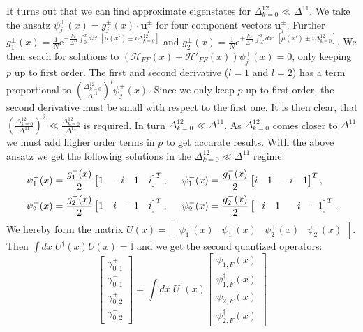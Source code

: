It turns out that we can find approximate eigenstates for $\Delta^{12}_{k=0} \ll \Delta^{11}$. We take the ansatz $\psi_j^{\pm}(x) = g_j^{\pm}(x)\cdot \mathbf{u}^{\pm}_j$ for four component vectors $\mathbf{u}^{\pm}_j$. Further $g_1^{\pm}(x) = \frac{1}{N}\text{e}^{-\frac{k_F}{\Delta^{11}}\int_0^x dx' \; \left[\mu(x') \pm i\Delta^{12}_{k=0}\right] }$ and $g_2^{\pm}(x) = \frac{1}{N}\text{e}^{+\frac{k_F}{\Delta^{11}}\int_{\mathcal{L}}^x dx' \; \left[\mu(x') \pm i\Delta^{12}_{k=0}\right] }$. We then seach for solutions to $(\mathcal{H}_{FF}(x) + \mathcal{H}'_{FF}(x))\psi_j^{\pm}(x) = 0$, only keeping $p$ up to first order. The first and second derivative ($l = 1$ and $l = 2$) has a term proportional to $\left(\frac{\Delta^{12}_{k=0}}{\Delta^{11}}\right)^l\psi_j^{\pm}(x)$. Since we only keep $p$ up to first order, the second derivative must be small with respect to the first one. It is then clear, that $\left(\frac{\Delta^{12}_{k=0}}{\Delta^{11}}\right)^2 \ll \frac{\Delta^{12}_{k=0}}{\Delta^{11}}$ is required. In turn $\Delta^{12}_{k=0} \ll \Delta^{11}$. As $\Delta^{12}_{k=0}$ comes closer to $\Delta^{11}$ we must add higher order terms in $p$ to get accurate results. With the above ansatz we get the following solutions in the $\Delta^{12}_{k=0} \ll \Delta^{11}$ regime:
\begin{align}
\psi_1^{+}(x) &= \frac{g_1^{+}(x)}{2}\begin{bmatrix} 1 & -i & 1 & i \end{bmatrix}^T, \hspace{0.5cm} \psi_1^{-}(x) = \frac{g_1^{-}(x)}{2}\begin{bmatrix} i & 1 & -i & 1 \end{bmatrix}^T, \nonumber \\
\psi_2^{+}(x) &= \frac{g_2^{+}(x)}{2}\begin{bmatrix} 1 & i & -1 & i \end{bmatrix}^T, \hspace{0.5cm} \psi_2^{-}(x) = \frac{g_2^{-}(x)}{2}\begin{bmatrix} -i & 1 & -i & -1 \end{bmatrix}^T.
\label{eq.zeromodesDelta12real}
\end{align}
We hereby form the matrix $U(x) = \begin{bmatrix} \psi_1^{+}(x) & \psi_1^{-}(x) & \psi_2^{+}(x) & \psi_2^{-}(x) \end{bmatrix}$. Then $\int dx \; U^\dagger(x) U(x) = \mathbb{I}$ and we get the second quantized operators:
\begin{equation}
\begin{bmatrix} \gamma^{+}_{0, 1} \\ \gamma^{-}_{0, 1} \\ \gamma^{+}_{0, 2} \\ \gamma^{-}_{0, 2} \end{bmatrix} = \int dx \; U^\dagger(x) \begin{bmatrix} \psi_{1, F}(x) \\ \psi_{1, F}^\dagger(x) \\ \psi_{2, F}(x) \\ \psi_{2, F}^\dagger(x) \end{bmatrix} \nonumber
\end{equation}
